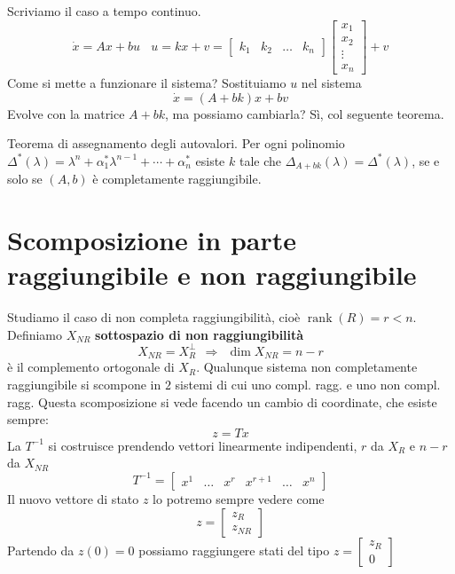 \documentclass[10pt,a4paper]{book}
\DeclareMathOperator{\rank}{rank}
\begin{document}
Scriviamo il caso a tempo continuo.
\begin{equation*}
	\dot{x} =Ax+bu\ \ \ \ \boxed{u=kx+v} =\begin{bmatrix}
	k_1 & k_2 & \dotsc  & k_n
	\end{bmatrix}\begin{bmatrix}
	x_1\\
	x_2\\
	\vdots \\
	x_n
	\end{bmatrix} +v
\end{equation*}
Come si mette a funzionare il sistema? Sostituiamo $u$ nel sistema
\begin{equation*}
	\boxed{\dot{x} =(A+bk) x+bv}
\end{equation*}
Evolve con la matrice $A+bk$, ma possiamo cambiarla? Sì, col seguente teorema.
\begin{theorem}
	Teorema di assegnamento degli autovalori. Per ogni polinomio $\Delta ^{*}(\lambda) =\lambda ^n +\alpha ^{*}_1 \lambda ^{n-1} +\cdots +\alpha ^{*}_n$ esiste $k$ tale che $\Delta _{A+bk}(\lambda) =\Delta ^{*}(\lambda)$, se e solo se $(A,b)$ è completamente raggiungibile.
\end{theorem}
\section{Scomposizione in parte raggiungibile e non raggiungibile}

Studiamo il caso di non completa raggiungibilità, cioè $\rank(R) =r< n$. Definiamo $X_{NR}$ \textbf{sottospazio di non raggiungibilità}
\begin{equation*}
	X_{NR} =X^{\perp }_R \ \ \Rightarrow \ \ \dim X_{NR} =n-r
\end{equation*}
è il complemento ortogonale di $X_R$. Qualunque sistema non completamente raggiungibile si scompone in $2$ sistemi di cui uno compl. ragg. e uno non compl. ragg. Questa scomposizione si vede facendo un cambio di coordinate, che esiste sempre:
\begin{equation*}
	z=Tx
\end{equation*}
La $T^{-1}$ si costruisce prendendo vettori linearmente indipendenti, $r$ da $X_R$ e $n-r$ da $X_{NR}$
\begin{equation*}
	T^{-1} =\begin{bmatrix}
	x^1 & \dotsc  & x^r & x^{r+1} & \dotsc  & x^n
	\end{bmatrix}
\end{equation*}
Il nuovo vettore di stato $z$ lo potremo sempre vedere come
\begin{equation*}
	z=\begin{bmatrix}
	z_R\\
	z_{NR}
	\end{bmatrix}
\end{equation*}
Partendo da $z(0) =0$ possiamo raggiungere stati del tipo $z=\begin{bmatrix}
z_R\\
0
\end{bmatrix}$
\end{document}

